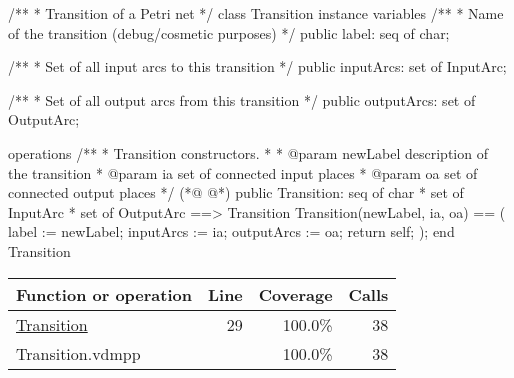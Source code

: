\begin{vdmpp}
/**
 * Transition of a Petri net
 */
class Transition
  instance variables
    /**
     * Name of the transition (debug/cosmetic purposes)
     */
    public label: seq of char;

    /**
     * Set of all input arcs to this transition
     */
    public inputArcs: set of InputArc;

    /**
     * Set of all output arcs from this transition
     */
    public outputArcs: set of OutputArc;

  operations
    /**
     * Transition constructors.
     *
     * @param newLabel description of the transition
     * @param ia set of connected input places
     * @param oa set of connected output places
     */
(*@
\label{Transition:29}
@*)
    public Transition: seq of char * set of InputArc * set of OutputArc ==> Transition
    Transition(newLabel, ia, oa) == (
      label := newLabel;
      inputArcs := ia;
      outputArcs := oa;
      return self;
    );
end Transition
\end{vdmpp}
\bigskip
\begin{longtable}{|l|r|r|r|}
\hline
Function or operation & Line & Coverage & Calls \\
\hline
\hline
\hyperref[Transition:29]{Transition} & 29&100.0\% & 38 \\
\hline
\hline
Transition.vdmpp & & 100.0\% & 38 \\
\hline
\end{longtable}